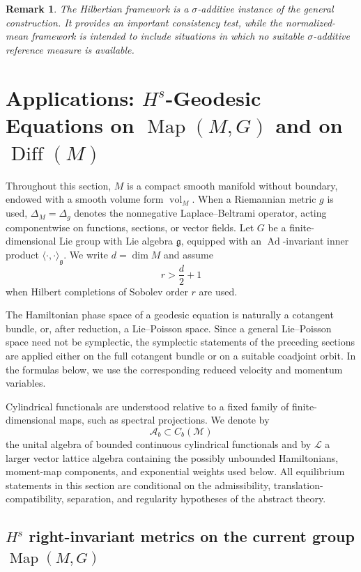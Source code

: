 \documentclass[11pt,reqno]{amsart}
\newtheorem{rem}[Theorem]{Remark}
\begin{document}
\begin{rem}
The Hilbertian framework is a $\sigma$-additive instance of the general
construction. It provides an important consistency test, while the
normalized-mean framework is intended to include situations in which no
suitable $\sigma$-additive reference measure is available.
\end{rem}


\section{Applications: $H^s$-Geodesic Equations on
$\operatorname{Map}(M,G)$ and on $\operatorname{Diff}(M)$}

Throughout this section, $M$ is a compact smooth manifold without
boundary, endowed with a smooth volume form $\operatorname{vol}_M$.
When a Riemannian metric $g$ is used,
$\Delta_M=\Delta_g$ denotes the nonnegative Laplace--Beltrami operator,
acting componentwise on functions, sections, or vector fields. Let $G$
be a finite-dimensional Lie group with Lie algebra $\mathfrak g$,
equipped with an $\operatorname{Ad}$-invariant inner product
$\langle\cdot,\cdot\rangle_{\mathfrak g}$. We write $d=\dim M$ and
assume
\[
r>\frac d2+1
\]
when Hilbert completions of Sobolev order $r$ are used.

The Hamiltonian phase space of a geodesic equation is naturally a
cotangent bundle, or, after reduction, a Lie--Poisson space. Since a
general Lie--Poisson space need not be symplectic, the symplectic
statements of the preceding sections are applied either on the full
cotangent bundle or on a suitable coadjoint orbit. In the formulas
below, we use the corresponding reduced velocity and momentum
variables.

Cylindrical functionals are understood relative to a fixed family of
finite-dimensional maps, such as spectral projections. We denote by
\[
\mathcal A_b\subset C_b(\mathcal M)
\]
the unital algebra of bounded continuous cylindrical functionals and by
$\mathcal L$ a larger vector lattice algebra containing the possibly
unbounded Hamiltonians, moment-map components, and exponential weights
used below. All equilibrium statements in this section are conditional
on the admissibility, translation-compatibility, separation, and
regularity hypotheses of the abstract theory.

\subsection{$H^s$ right-invariant metrics on the current group
$\operatorname{Map}(M,G)$}
\end{document}
